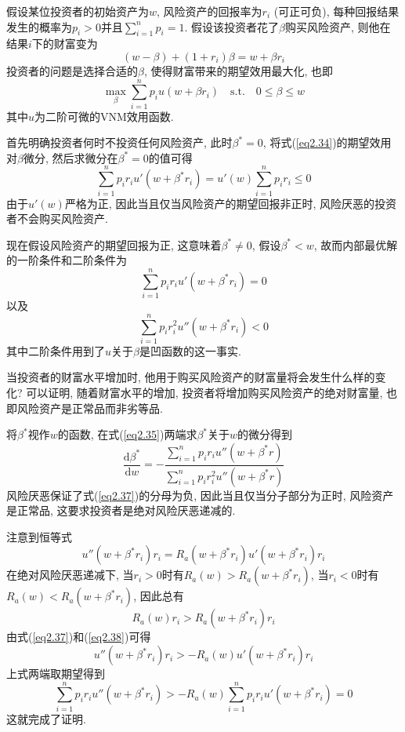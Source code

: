 \documentclass[cn, 12pt, math=mtpro2, bibstyle=apa, blue]{elegantbook}
\begin{document}
\begin{example}
假设某位投资者的初始资产为$w$, 风险资产的回报率为$r_i$ (可正可负), 每种回报结果发生的概率为$p_i>0$并且$\sum_{i=1}^{n}p_i=1$. 假设该投资者花了$\beta$购买风险资产, 则他在结果$i$下的财富变为
$$(w-\beta)+(1+r_i)\beta=w+\beta r_i$$
投资者的问题是选择合适的$\beta$, 使得财富带来的期望效用最大化, 也即
\begin{equation}\label{eq2.34}
  \max_\beta \sum_{i=1}^{n}p_iu(w+\beta r_i)\quad \text{s.t.}\quad 0\leq \beta\leq w
\end{equation}
其中$u$为二阶可微的VNM效用函数. 

首先明确投资者何时不投资任何风险资产, 此时$\beta^\ast=0$, 将式(\ref{eq2.34})的期望效用对$\beta$微分, 然后求微分在$\beta^\ast=0$的值可得
$$\sum_{i=1}^{n}p_ir_iu'(w+\beta^\ast r_i)=u'(w)\sum_{i=1}^{n}p_ir_i\leq 0$$
由于$u'(w)$严格为正, 因此当且仅当风险资产的期望回报非正时, 风险厌恶的投资者不会购买风险资产. 

现在假设风险资产的期望回报为正, 这意味着$\beta^\ast\neq 0$, 假设$\beta^\ast<w$, 故而内部最优解的一阶条件和二阶条件为
\begin{equation}\label{eq2.35}
  \sum_{i=1}^{n}p_ir_iu'(w+\beta^\ast r_i)=0
\end{equation}
以及
\begin{equation}\label{eq2.36}
\sum_{i=1}^{n}p_ir_i^2u''(w+\beta^\ast r_i)<0
\end{equation}
其中二阶条件用到了$u$关于$\beta$是凹函数的这一事实.

当投资者的财富水平增加时, 他用于购买风险资产的财富量将会发生什么样的变化? 可以证明, 随着财富水平的增加, 投资者将增加购买风险资产的绝对财富量, 也即风险资产是正常品而非劣等品.

将$\beta^\ast$视作$w$的函数, 在式(\ref{eq2.35})两端求$\beta^\ast$关于$w$的微分得到
\begin{equation}\label{eq2.37}
  \frac{\text{d}\beta^\ast}{\text{d}w}=-\frac{\sum_{i=1}^{n}p_ir_iu''(w+\beta^\ast r)}{\sum_{i=1}^{n}p_ir_i^2u''(w+\beta^\ast r)}
\end{equation}
风险厌恶保证了式(\ref{eq2.37})的分母为负, 因此当且仅当分子部分为正时, 风险资产是正常品, 这要求投资者是绝对风险厌恶递减的.

注意到恒等式
$$u''(w+\beta^\ast r_i)r_i=R_a(w+\beta^\ast r_i)u'(w+\beta^\ast r_i)r_i$$
在绝对风险厌恶递减下, 当$r_i>0$时有$R_a(w)>R_a(w+\beta^\ast r_i)$, 当$r_i<0$时有$R_a(w)<R_a(w+\beta^\ast r_i)$, 因此总有
\begin{equation}\label{eq2.38}
  R_a(w)r_i>R_a(w+\beta^\ast r_i)r_i
\end{equation}
由式(\ref{eq2.37})和(\ref{eq2.38})可得
$$u''(w+\beta^\ast r_i)r_i>-R_a(w)u'(w+\beta^\ast r_i)r_i$$
上式两端取期望得到
$$\sum_{i=1}^{n}p_ir_iu''(w+\beta^\ast r_i)>-R_a(w)\sum_{i=1}^{n}p_ir_iu'(w+\beta^\ast r_i)=0$$
这就完成了证明.

\end{example}
\end{document}
